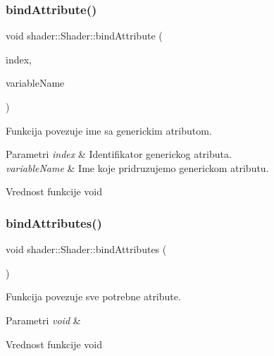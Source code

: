 \subsubsection{\texorpdfstring{bind\+Attribute()}{bindAttribute()}}
{\footnotesize\ttfamily void shader\+::\+Shader\+::bind\+Attribute (\begin{DoxyParamCaption}\item[{int}]{index,  }\item[{const char $\ast$}]{variable\+Name }\end{DoxyParamCaption})}



Funkcija povezuje ime sa generickim atributom. 


\begin{DoxyParams}{Parametri}
{\em index} & Identifikator generickog atributa. \\
\hline
{\em variable\+Name} & Ime koje pridruzujemo generickom atributu. \\
\hline
\end{DoxyParams}
\begin{DoxyReturn}{Vrednost funkcije}
void 
\end{DoxyReturn}
\mbox{\label{classshader_1_1Shader_a0b80abf1266063b5b2dea30422dd3358}} 
\subsubsection{\texorpdfstring{bind\+Attributes()}{bindAttributes()}}
{\footnotesize\ttfamily void shader\+::\+Shader\+::bind\+Attributes (\begin{DoxyParamCaption}\item[{void}]{ }\end{DoxyParamCaption})}



Funkcija povezuje sve potrebne atribute. 


\begin{DoxyParams}{Parametri}
{\em void} & \\
\hline
\end{DoxyParams}
\begin{DoxyReturn}{Vrednost funkcije}
void 
\end{DoxyReturn}
\mbox{\label{classshader_1_1Shader_af79c5615b39eae7e6368508429645c33}} 
